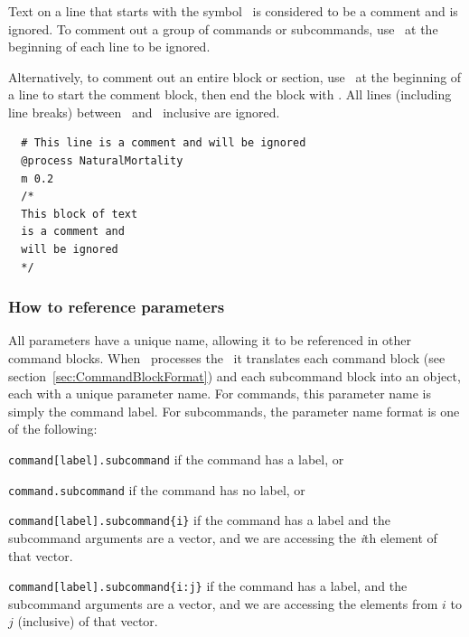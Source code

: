 \subsubsection{}

Text on a line that starts with the symbol \commentline\ is considered to be a comment and is ignored. To comment out a group of commands or subcommands, use \commentline\ at the beginning of each line to be ignored.

Alternatively, to comment out an entire block or section, use \commentstart\ at the beginning of a line to start the comment block, then end the block with \commentend. All lines (including line breaks) between \commentstart\ and \commentend\ inclusive are ignored.

\small{\begin{verbatim}
  # This line is a comment and will be ignored
  @process NaturalMortality
  m 0.2
  /* 
  This block of text
  is a comment and
  will be ignored
  */
\end{verbatim}}

\subsubsection{How to reference parameters\label{sec:parameter-names}}

All parameters have a unique name, allowing it to be referenced in other command blocks. When \CNAME\ processes the \config\ it translates each command block (see section~\ref{sec:CommandBlockFormat}) and each subcommand block into an object, each with a unique parameter name. For commands, this parameter name is simply the command label. For subcommands, the parameter name format is one of the following:

\begin{description}
	\item \texttt{command[label].subcommand} if the command has a label, or
	\item \texttt{command.subcommand} if the command has no label, or
	\item \texttt{command[label].subcommand\{i\}} if the command has a label and the subcommand arguments are a vector, and we are accessing the  \emph{i}th element of that vector.
	\item \texttt{command[label].subcommand\{i:j\}} if the command has a label, and the subcommand arguments are a vector, and we are accessing the elements from $i$ to $j$ (inclusive) of that vector.
\end{description}

